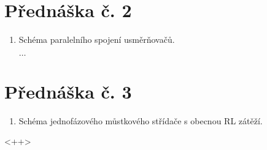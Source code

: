 \documentclass[a4paper, 12pt]{article}
\begin{document}
\section{Přednáška č. 2}
\begin{enumerate}
  \item Schéma paralelního spojení usměrňovačů.

    $\dots$

  \end{enumerate}

\section{Přednáška č. 3}
  \begin{enumerate}
    \item Schéma jednofázového můstkového střídače s obecnou RL zátěží.
  \end{enumerate}<++>
\end{document}

